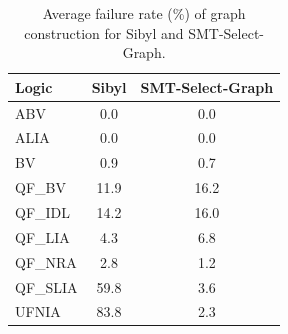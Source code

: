 \begin{table}[t]
\centering
\begin{tabular}{lcc}
\toprule
Logic & Sibyl & SMT-Select-Graph \\
\midrule
ABV & 0.0 & 0.0 \\
ALIA & 0.0 & 0.0 \\
BV & 0.9 & 0.7 \\
QF\_BV & 11.9 & 16.2 \\
QF\_IDL & 14.2 & 16.0 \\
QF\_LIA & 4.3 & 6.8 \\
QF\_NRA & 2.8 & 1.2 \\
QF\_SLIA & 59.8 & 3.6 \\
UFNIA & 83.8 & 2.3 \\
\bottomrule
\end{tabular}
\caption{Average failure rate (\%) of graph construction for Sibyl and SMT-Select-Graph.}
\label{tab:feature-fail}
\end{table}
